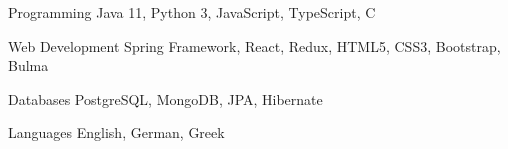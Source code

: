 


\begin{cvskills}


\cvskill
{Programming} %
{Java 11, Python 3, JavaScript, TypeScript, C} %


\cvskill
{Web Development} %
{Spring Framework, React, Redux, HTML5, CSS3, Bootstrap, Bulma} %


\cvskill
{Databases} %
{PostgreSQL, MongoDB, JPA, Hibernate} %


\cvskill
{Languages} %
{English, German, Greek} %


\end{cvskills}